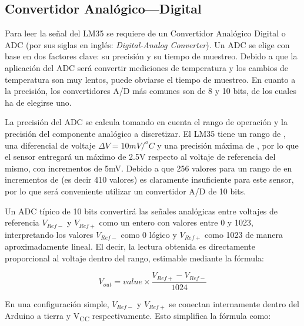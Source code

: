 %
%


\subsection{Convertidor Analógico---Digital}%
\label{sec:intro-adc}
Para leer la señal del LM35 se requiere de un Convertidor Analógico Digital o ADC (por sus siglas en inglés: \emph{Digital-Analog Converter}).
Un ADC se elige con base en dos factores clave: su precisión y su tiempo de muestreo.
Debido a que la aplicación del ADC será convertir mediciones de temperatura y los cambios de temperatura son muy lentos,\footnotemark{} puede obviarse el tiempo de muestreo.
En cuanto a la precisión, los convertidores A/D más comunes son de 8 y 10 bits, de los cuales ha de elegirse uno.

La precisión del ADC se calcula tomando en cuenta el rango de operación y la precisión del componente analógico a discretizar.
El LM35 tiene un rango de , una diferencial de voltaje $\Delta{}V=10mV/^{o}C$ y una precisión máxima de , por lo que el sensor entregará un máximo de 2.5V respecto al voltaje de referencia del mismo, con incrementos de 5mV.
Debido a que 256 valores para un rango de  en incrementos de  (es decir 410 valores) es claramente insuficiente para este sensor, por lo que será conveniente utilizar un convertidor A/D de 10 bits.

Un ADC típico de 10 bits convertirá las señales analógicas entre voltajes de referencia $V_{Ref-}$ y $V_{Ref+}$ como un entero con valores entre 0 y 1023, interpretando los valores $V_{Ref-}$ como 0 lógico y $V_{Ref+}$ como 1023 de manera aproximadamente lineal.
El decir, la lectura obtenida es directamente proporcional al voltaje dentro del rango, estimable mediante la fórmula:

\begin{equation}
V_{out}= value \times \frac{ V_{Ref+} - V_{Ref-} }{ 1024 }
\end{equation}

En una configuración simple, $V_{Ref-}$ y $V_{Ref+}$ se conectan internamente dentro del Arduino a tierra y V\textsubscript{CC} respectivamente. Esto simplifica la fórmula como:

